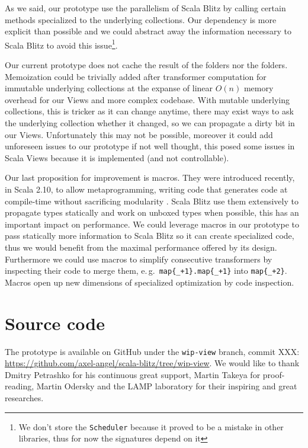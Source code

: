\documentclass[a4paper,12pt,twocolumn]{article}
\newcommand{\eg}{e.\,g.\ }
\begin{document}
As we said, our prototype use the parallelism of Scala Blitz by calling certain methods specialized to the underlying collections.
Our dependency is more explicit than possible and we could abstract away the information necessary to Scala Blitz to avoid this issue\footnote{We don't store the {\tt Scheduler} because it proved to be a mistake in other libraries, thus for now the signatures depend on it}.


Our current prototype does not cache the result of the folders nor the folders.
Memoization could be trivially added after transformer computation for immutable underlying collections at the expanse of linear $O(n)$ memory overhead for our Views and more complex codebase.
With mutable underlying collections, this is tricker as it can change anytime, there may exist ways to ask the underlying collection whether it changed, so we can propagate a dirty bit in our Views.
Unfortunately this may not be possible, moreover it could add unforeseen issues to our prototype if not well thought, this posed some issues in Scala Views because it is implemented (and not controllable).

Our last proposition for improvement is macros.
They were introduced recently, in Scala 2.10, to allow metaprogramming, writing code that generates code at compile-time without sacrificing modularity \cite{scala-macros}.
Scala Blitz use them extensively to propagate types statically and work on unboxed types when possible, this has an important impact on performance.
We could leverage macros in our prototype to pass statically more information to Scala Blitz so it can create specialized code, thus we would benefit from the maximal performance offered by its design.
Furthermore we could use macros to simplify consecutive transformers by inspecting their code to merge them, \eg \verb|map{_+1}.map{_+1}| into \verb|map{_+2}|.
Macros open up new dimensions of specialized optimization by code inspection.

\appendix
\section{Source code}
The prototype is available on GitHub under the \verb|wip-view| branch, commit XXX:
\url{https://github.com/axel-angel/scala-blitz/tree/wip-view}.
We would like to thank Dmitry Petrashko for his continuous great support, Martin Takeya for proof-reading, Martin Odersky and the LAMP laboratory for their inspiring and great researches.


{}


\nocite{scala-bitrot}
\end{document}

